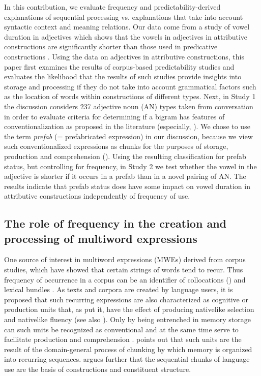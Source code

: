 \documentclass[output=paper]{langscibook}
\begin{document}
In this contribution, we evaluate frequency and predictability-derived explanations of sequential processing vs. explanations that take into account syntactic context and meaning relations. Our data come from a study of vowel duration in adjectives which shows that the vowels in adjectives in attributive constructions are significantly shorter than those used in predicative constructions \citep{BybeeSouza2019}. Using the data on adjectives in attributive constructions, this paper first examines the results of corpus-based predictability studies and evaluates the likelihood that the results of such studies provide insights into storage and processing if they do not take into account grammatical factors such as the location of words within constructions of different types. Next, in Study 1 the discussion considers 237 adjective noun (AN) types taken from conversation in order to evaluate criteria for determining if a bigram has features of conventionalization as proposed in the literature (especially, \citealt{PawleySyder1983,ErmanWarren2000,Wray2002,CorriganEtAl2009}). We chose to use the term \textit{prefab} (= prefabricated expression) in our discussion, because we view such conventionalized expressions as chunks for the purposes of storage, production and comprehension (\citealt{Bybee1998,Bybee2010}). Using the resulting classification for prefab status, but controlling for frequency, in Study 2 we test whether the vowel in the adjective is shorter if it occurs in a prefab than in a novel pairing of AN. The results indicate that prefab status does have some impact on vowel duration in attributive constructions independently of frequency of use. 

\subsection{The role of frequency in the creation and processing of multiword expressions} 

One source of interest in multiword expressions (MWEs) derived from corpus studies, which have showed that certain strings of words tend to recur. Thus frequency of occurrence in a corpus can be an identifier of collocations (\citealt{JonesSinclair1974}) and lexical bundles \citep{BiberEtAl1999}. As texts and corpora are created by language users, it is proposed that such recurring expressions are also characterized as cognitive or production units that, as \citet{PawleySyder1983} put it, have the effect of producing nativelike selection and nativelike fluency (see also \citealt{Siyanova-ChanturiaMartinez2015}). Only by being entrenched in memory storage can such units be recognized as conventional and at the same time serve to facilitate production and comprehension \citep{Langacker2008}. \citet{Ellis1996} points out that such units are the result of the domain-general process of chunking by which memory is organized into recurring sequences. \citet{Bybee1998, Bybee2002, Bybee2010} argues further that the sequential chunks of language use are the basis of constructions and constituent structure. 
\end{document}
